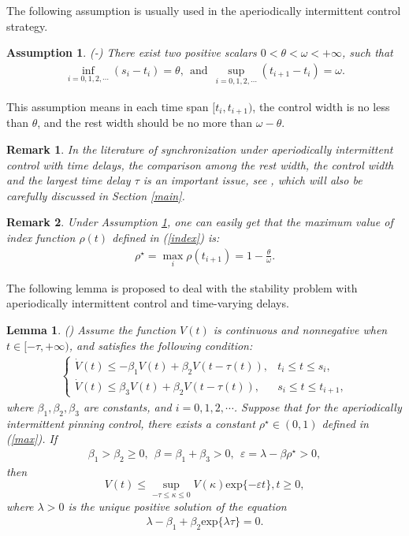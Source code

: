 \documentclass[review]{elsarticle}
\newtheorem{lem}{Lemma}
\newtheorem{asu}{Assumption}
\newtheorem{rem}{Remark}
\begin{document}
The following assumption is usually used in the aperiodically intermittent control strategy.
\begin{asu}\label{asutime}
(\cite{LC2015}-\cite{LLC15}) There exist two positive scalars $0<\theta<\omega<+\infty$, such that
\begin{align*}
\inf\limits_{i=0,1,2,\cdots}(s_i-t_i)=\theta, ~~\mathrm{and}~~\sup\limits_{i=0,1,2,\cdots}(t_{i+1}-t_i)=\omega.
\end{align*}
\end{asu}
This assumption means in each time span $[t_i, t_{i+1})$, the control width is no less than $\theta$, and the rest width should be no more than $\omega-\theta$.

\begin{rem}
In the literature of synchronization under aperiodically intermittent control with time delays, the comparison among the rest width, the control width and the largest time delay $\tau$ is an important issue, see \cite{LC15}, which will also be carefully discussed in Section \ref{main}.
\end{rem}

\begin{rem}
Under Assumption \ref{asutime}, one can easily get that the maximum value of index function $\rho(t)$ defined in (\ref{index}) is:
\begin{align}\label{max}
\rho^{\star}=\max_i\rho(t_{i+1})=1-\frac{\theta}{\omega}.
\end{align}
\end{rem}



The following lemma is proposed to deal with the stability problem with aperiodically intermittent control and time-varying delays.

\begin{lem}\label{synlem}
(\cite{LC15}) Assume the function $V(t)$ is continuous and nonnegative when $t\in [-{\tau},+\infty)$, and satisfies the following condition:
\begin{align}\label{del}
\left\{
\begin{array}{ll}
\dot{V}(t)\leq -\beta_1V(t)+\beta_2V(t-\tau(t)),&t_i\leq t\leq s_i,\\
\dot{V}(t)\leq \beta_3V(t)+\beta_2V(t-\tau(t)),&s_i\leq t\leq t_{i+1},
\end{array}
\right.
\end{align}
where $\beta_1, \beta_2, \beta_3$ are constants, and $i=0,1,2,\cdots$.  Suppose that for the aperiodically intermittent pinning control, there exists a constant $\rho^{\star}\in (0,1)$ defined in (\ref{max}). If
\begin{align*}
\beta_1>\beta_2\geq 0,~~\beta=\beta_1+\beta_3>0, ~~\varepsilon=\lambda-\beta\rho^{\star}>0,
\end{align*}
then
\[
V(t)\leq \sup_{-{\tau}\leq \kappa \leq 0}V(\kappa)\mathrm{exp}\{-\varepsilon t\}, t \geq 0,
\]
where $\lambda>0$ is the unique positive solution of the equation
\begin{align*}
\lambda-\beta_1+\beta_2 \mathrm{exp}\{\lambda{\tau}\}=0.
\end{align*}
\end{lem}
\end{document}
